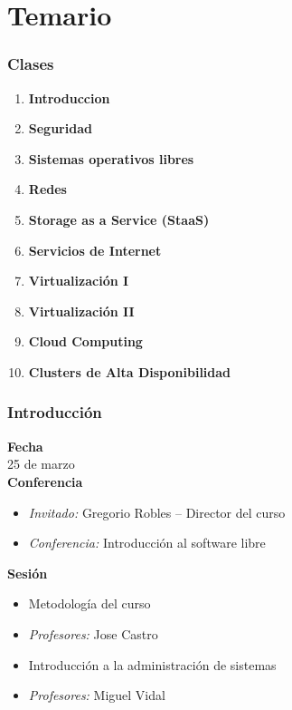 \documentclass{beamer}
\begin{document}
\section{Temario}
\begin{frame}
\frametitle{Clases}
\begin{enumerate}
\item \textbf{Introduccion}
\item \textbf{Seguridad}
\item \textbf{Sistemas operativos libres}
\item \textbf{Redes}
\item \textbf{Storage as a Service (StaaS)}
\item \textbf{Servicios de Internet}
\item \textbf{Virtualización I}
\item \textbf{Virtualización II}
\item \textbf{Cloud Computing}
\item \textbf{Clusters de Alta Disponibilidad}
\end{enumerate}
\end{frame}

\begin{frame}
  \frametitle{Introducción}
  \textbf{Fecha}\\
    25 de marzo\\
  \textbf{Conferencia}
    \begin{itemize}
      \item \textit{Invitado:} Gregorio Robles -- Director del curso
      \item \textit{Conferencia:} Introducción al software libre
    \end{itemize}
  \textbf{Sesión}
    \begin{itemize}
      \item Metodología del curso
      \item \textit{Profesores:} Jose Castro
    \end{itemize}
    \begin{itemize}
      \item Introducción a la administración de sistemas
      \item \textit{Profesores:} Miguel Vidal
    \end{itemize}
\end{frame}
\end{document}
